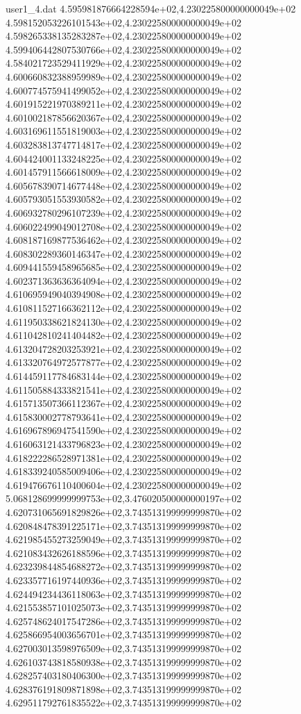 \begin{filecontents}{user1_4.dat}
4.595981876664228594e+02,4.230225800000000049e+02
4.598152053226101543e+02,4.230225800000000049e+02
4.598265338135283287e+02,4.230225800000000049e+02
4.599406442807530766e+02,4.230225800000000049e+02
4.584021723529411929e+02,4.230225800000000049e+02
4.600660832388959989e+02,4.230225800000000049e+02
4.600774575941499052e+02,4.230225800000000049e+02
4.601915221970389211e+02,4.230225800000000049e+02
4.601002187856620367e+02,4.230225800000000049e+02
4.603169611551819003e+02,4.230225800000000049e+02
4.603283813747714817e+02,4.230225800000000049e+02
4.604424001133248225e+02,4.230225800000000049e+02
4.601457911566618009e+02,4.230225800000000049e+02
4.605678390714677448e+02,4.230225800000000049e+02
4.605793051553930582e+02,4.230225800000000049e+02
4.606932780296107239e+02,4.230225800000000049e+02
4.606022499049012708e+02,4.230225800000000049e+02
4.608187169877536462e+02,4.230225800000000049e+02
4.608302289360146347e+02,4.230225800000000049e+02
4.609441559458965685e+02,4.230225800000000049e+02
4.602371363636364094e+02,4.230225800000000049e+02
4.610695949040394908e+02,4.230225800000000049e+02
4.610811527166362112e+02,4.230225800000000049e+02
4.611950338621824130e+02,4.230225800000000049e+02
4.611042810241404482e+02,4.230225800000000049e+02
4.613204728203253921e+02,4.230225800000000049e+02
4.613320764972577877e+02,4.230225800000000049e+02
4.614459117784683144e+02,4.230225800000000049e+02
4.611505884333821541e+02,4.230225800000000049e+02
4.615713507366112367e+02,4.230225800000000049e+02
4.615830002778793641e+02,4.230225800000000049e+02
4.616967896947541590e+02,4.230225800000000049e+02
4.616063121433796823e+02,4.230225800000000049e+02
4.618222286528971381e+02,4.230225800000000049e+02
4.618339240585009406e+02,4.230225800000000049e+02
4.619476676110400604e+02,4.230225800000000049e+02
5.068128699999999753e+02,3.476020500000000197e+02
4.620731065691829826e+02,3.743513199999999870e+02
4.620848478391225171e+02,3.743513199999999870e+02
4.621985455273259049e+02,3.743513199999999870e+02
4.621083432626188596e+02,3.743513199999999870e+02
4.623239844854688272e+02,3.743513199999999870e+02
4.623357716197440936e+02,3.743513199999999870e+02
4.624494234436118063e+02,3.743513199999999870e+02
4.621553857101025073e+02,3.743513199999999870e+02
4.625748624017547286e+02,3.743513199999999870e+02
4.625866954003656701e+02,3.743513199999999870e+02
4.627003013598976509e+02,3.743513199999999870e+02
4.626103743818580938e+02,3.743513199999999870e+02
4.628257403180406300e+02,3.743513199999999870e+02
4.628376191809871898e+02,3.743513199999999870e+02
4.629511792761835522e+02,3.743513199999999870e+02

\end{filecontents}
